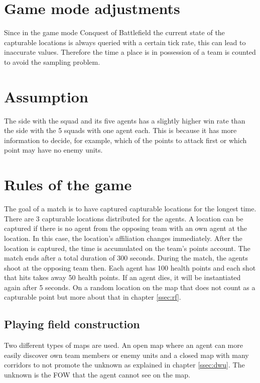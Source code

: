 \documentclass[]{report}
\begin{document}
		\section{Game mode adjustments}
		Since in the game mode Conquest of Battlefield \citep{battlefield1modes} the current state of the capturable locations is always queried with a certain tick rate, this can lead to inaccurate values. Therefore the time a place is in possession of a team is counted to avoid the sampling problem.
		
		\section{Assumption} \label{assumption}
		The side with the squad and its five agents has a slightly higher win rate than the side with the 5 squads with one agent each. This is because it has more information to decide, for example, which of the points to attack first or which point may have no enemy units. 
		
		\section{Rules of the game}
		The goal of a match is to have captured capturable locations for the longest time. There are 3 capturable locations distributed for the agents. A location can be captured if there is no agent from the opposing team with an own agent at the location. In this case, the location's affiliation changes immediately. After the location is captured, the time is accumulated on the team's points account. The match ends after a total duration of 300 seconds. 
		During the match, the agents shoot at the opposing team then. Each agent has 100 health points and each shot that hits takes away 50 health points. If an agent dies, it will be instantiated again after 5 seconds. On a random location on the map that does not count as a capturable point but more about that in chapter \ref{ssec:rf}. 
		
		\subsection{Playing field construction}
		Two different types of maps are used. An open map where an agent can more easily discover own team members or enemy units and a closed map with many corridors to not promote the unknown as explained in chapter \ref{ssec:dwu}. The unknown is the \ac{FOW} that the agent cannot see on the map. 
		
\end{document}
